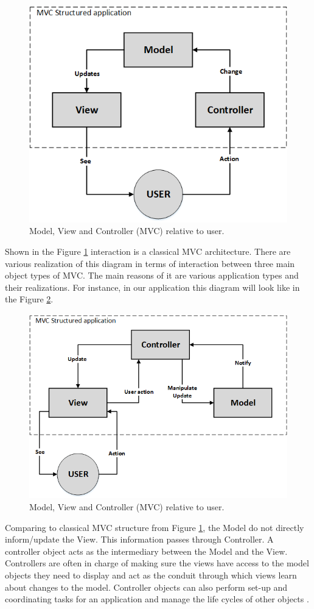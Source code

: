 \begin{figure}[ht]\centering
\includegraphics[width=0.7\linewidth]{Data/Control_Software/MVC_general.png}
\caption{Model, View and Controller (MVC) relative to user.}
\label{fig:mvc_general}
\end{figure}

Shown in the Figure \ref{fig:mvc_general} interaction is a classical MVC architecture. There are various realization of this diagram in terms of interaction between three main object types of MVC. The main reasons of it are various application types and their realizations. For instance, in our application this diagram will look like in the Figure \ref{fig:mvc_custom}.

\begin{figure}[ht]\centering
\includegraphics[width=0.7\linewidth]{Data/Control_Software/MVC_custom.png}
\caption{Model, View and Controller (MVC) relative to user.}
\label{fig:mvc_custom}
\end{figure}

Comparing to classical MVC structure from Figure \ref{fig:mvc_general}, the Model do not directly inform/update the View. This information passes through Controller. A controller object acts as the intermediary between the Model and the View. Controllers are often in charge of making sure the views have access to the model objects they need to display and act as the conduit through which views learn about changes to the model. Controller objects can also perform set-up and coordinating tasks for an application and manage the life cycles of other objects \cite{apple_MVC}.

